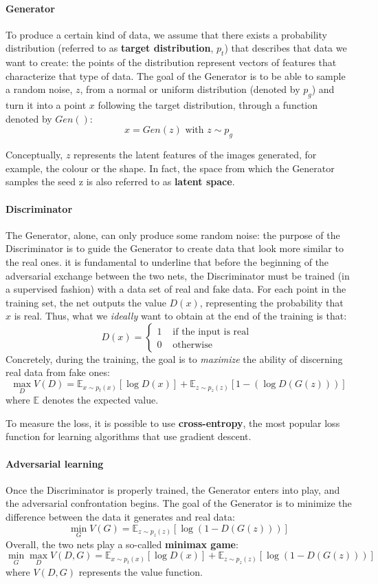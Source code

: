 \documentclass[target=mst,aauheader=aics]{thud}
\theoremstyle{definition}
\begin{document}
\paragraph{Generator}
To produce a certain kind of data, we assume that there exists a probability distribution (referred to as \textbf{target distribution}, $p_t$) that describes that data we want to create: the points of the distribution represent vectors of features that characterize that type of data. The goal of the Generator is to be able to sample a random noise, $z$, from a normal or uniform distribution (denoted by $p_g$) and turn it into a point $x$  following the target distribution, through a function denoted by $Gen()$:
\[
x = Gen(z) \text{ with } z \sim p_g
\]

Conceptually, $z$ represents the latent features of the images generated, for example, the colour or the shape. In fact, the space from which the Generator samples the seed z is also referred to as \textbf{latent space}.
\paragraph{Discriminator}
The Generator, alone, can only produce some random noise: the purpose of the Discriminator is to guide the Generator to create data that look more similar to the real ones. it is fundamental to underline that before the beginning of the adversarial exchange between the two nets, the Discriminator must be trained (in a supervised fashion) with a data set of real and fake data.
For each point in the training set, the net outputs the value $D(x)$, representing the probability that $x$ is real. Thus, what we \textit{ideally} want to obtain at the end of the training is that:
\[
D(x) = \begin{cases}
	1 &\text{ if the input is real }\\
	0 & \text{ otherwise }
\end{cases}
\]
Concretely, during the training, the goal is to \textit{maximize} the ability of discerning real data from fake ones:
\[
\max_D V(D) = \mathbb{E}_{x\sim p_t(x)}[\log D(x)] + \mathbb{E}_{z\sim p_z(z)}[1-(\log D(G(z)))]
\]
where $\mathbb{E}$ denotes the expected value.

To measure the loss, it is possible to use \textbf{cross-entropy}, the most popular loss function for learning algorithms that use gradient descent.
\paragraph{Adversarial learning}
Once the Discriminator is properly trained, the Generator enters into play, and the adversarial confrontation begins. The goal of the Generator is to minimize the difference between the data it generates and real data:
\[
\min_G V(G) = \mathbb{E}_{z\sim p_z(z)}[\log(1-D(G(z)))]
\]
Overall, the two nets play a so-called \textbf{minimax game}:
\[
\min_G \max_D V(D,G) = \mathbb{E}_{x\sim p_t(x)}[\log D(x)] + \mathbb{E}_{z\sim p_z(z)}[\log (1-D(G(z)))]
\]
where $V(D,G)$ represents the value function.
\end{document}
